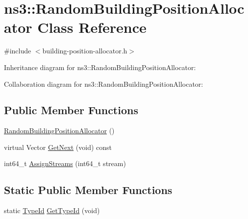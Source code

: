 \hypertarget{classns3_1_1RandomBuildingPositionAllocator}{}\section{ns3\+:\+:Random\+Building\+Position\+Allocator Class Reference}
\label{classns3_1_1RandomBuildingPositionAllocator}


{\ttfamily \#include $<$building-\/position-\/allocator.\+h$>$}



Inheritance diagram for ns3\+:\+:Random\+Building\+Position\+Allocator\+:


Collaboration diagram for ns3\+:\+:Random\+Building\+Position\+Allocator\+:
\subsection*{Public Member Functions}
\begin{DoxyCompactItemize}
\item 
\hyperlink{classns3_1_1RandomBuildingPositionAllocator_af82ab557d396b26ffcbb5fe22d85a7d3}{Random\+Building\+Position\+Allocator} ()
\item 
virtual Vector \hyperlink{classns3_1_1RandomBuildingPositionAllocator_af69e84fdb3d52246f61228ab4b9ac391}{Get\+Next} (void) const 
\item 
int64\+\_\+t \hyperlink{classns3_1_1RandomBuildingPositionAllocator_aebe16d91cd077900819278ef6e08d268}{Assign\+Streams} (int64\+\_\+t stream)
\end{DoxyCompactItemize}
\subsection*{Static Public Member Functions}
\begin{DoxyCompactItemize}
\item 
static \hyperlink{classns3_1_1TypeId}{Type\+Id} \hyperlink{classns3_1_1RandomBuildingPositionAllocator_a15b1e3e6a0951073795e5e05d5ac28f1}{Get\+Type\+Id} (void)
\end{DoxyCompactItemize}
